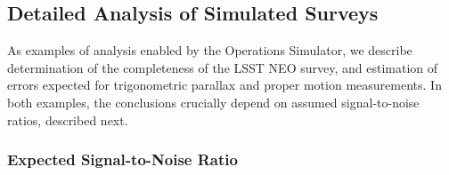 \documentclass{emulateapj}
\begin{document}
\subsection{  Detailed Analysis of Simulated Surveys  } 

As examples of analysis enabled by the Operations Simulator, we describe 
determination of the completeness of the LSST NEO survey, and estimation 
of errors expected for trigonometric parallax and proper motion measurements. 
In both examples, the conclusions crucially depend on assumed signal-to-noise
ratios, described next.

\subsubsection{  Expected Signal-to-Noise Ratio } 
\end{document}
